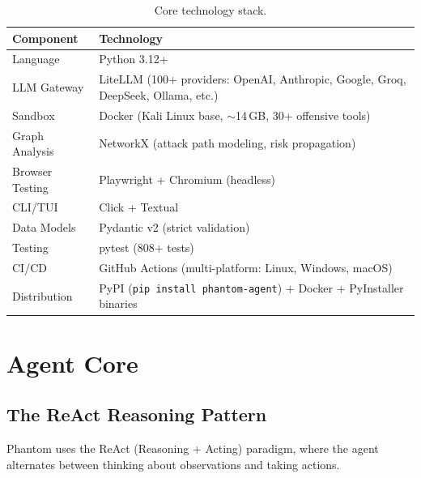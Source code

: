 \documentclass[12pt,a4paper]{report}
\begin{document}
\begin{table}[H]
\centering
\caption{Core technology stack.}
\begin{tabularx}{\textwidth}{lX}
\toprule
\textbf{Component} & \textbf{Technology} \\
\midrule
Language & Python 3.12+ \\
LLM Gateway & LiteLLM (100+ providers: OpenAI, Anthropic, Google, Groq, DeepSeek, Ollama, etc.) \\
Sandbox & Docker (Kali Linux base, $\sim$14\,GB, 30+ offensive tools) \\
Graph Analysis & NetworkX (attack path modeling, risk propagation) \\
Browser Testing & Playwright + Chromium (headless) \\
CLI/TUI & Click + Textual \\
Data Models & Pydantic v2 (strict validation) \\
Testing & pytest (808+ tests) \\
CI/CD & GitHub Actions (multi-platform: Linux, Windows, macOS) \\
Distribution & PyPI (\texttt{pip install phantom-agent}) + Docker + PyInstaller binaries \\
\bottomrule
\end{tabularx}
\end{table}


\chapter{Agent Core}

\section{The ReAct Reasoning Pattern}

Phantom uses the ReAct (Reasoning + Acting) paradigm, where the agent alternates between thinking about observations and taking actions.
\end{document}
